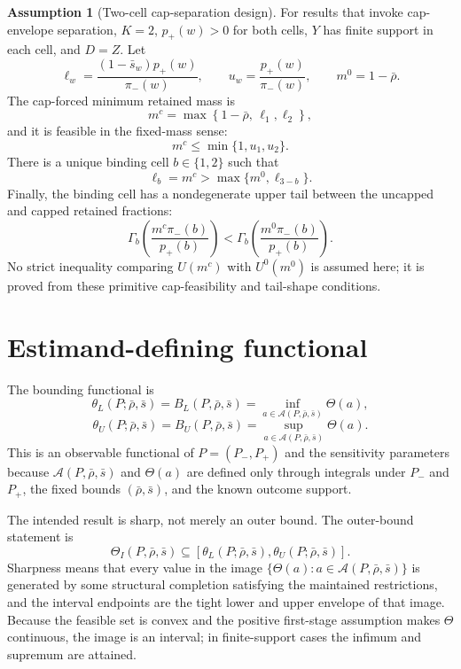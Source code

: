 \documentclass[11pt]{article}
\theoremstyle{definition}
\newtheorem{assumption}{Assumption}
\theoremstyle{plain}
\theoremstyle{remark}
\begin{document}
\begin{assumption}[Two-cell cap-separation design]\label{ass:cap-separation}
For results that invoke cap-envelope separation, \(K=2\), \(p_+(w)>0\) for both cells,
\(Y\) has finite support in each cell, and \(D=Z\).  Let
\[
  \ell_w=\frac{(1-\bar s_w)p_+(w)}{\pi_-(w)},
  \qquad
  u_w=\frac{p_+(w)}{\pi_-(w)},
  \qquad
  m^0=1-\bar\rho .
\]
The cap-forced minimum retained mass is
\[
  m^c=\max\left\{1-\bar\rho,\,
    \ell_1,\ell_2
  \right\},
\]
and it is feasible in the fixed-mass sense:
\[
  m^c\le \min\{1,u_1,u_2\}.
\]
There is a unique binding cell \(b\in\{1,2\}\) such that
\[
  \ell_b=m^c>\max\{m^0,\ell_{3-b}\}.
\]
Finally, the binding cell has a nondegenerate upper tail between the uncapped and capped
retained fractions:
\[
  \Gamma_b\!\left(\frac{m^c\pi_-(b)}{p_+(b)}\right)
  <
  \Gamma_b\!\left(\frac{m^0\pi_-(b)}{p_+(b)}\right).
\]
No strict inequality comparing \(U(m^c)\) with \(U^0(m^0)\) is assumed here; it is proved
from these primitive cap-feasibility and tail-shape conditions.
\end{assumption}

\section{Estimand-defining functional}
The bounding functional is
\[
  \theta_L(P;\bar\rho,\bar s)=B_L(P,\bar\rho,\bar s)
  =\inf_{a\in\mathcal A(P,\bar\rho,\bar s)}\Theta(a),
\]
\[
  \theta_U(P;\bar\rho,\bar s)=B_U(P,\bar\rho,\bar s)
  =\sup_{a\in\mathcal A(P,\bar\rho,\bar s)}\Theta(a).
\]
This is an observable functional of \(P=(P_-,P_+)\) and the sensitivity parameters because
\(\mathcal A(P,\bar\rho,\bar s)\) and \(\Theta(a)\) are defined only through integrals
under \(P_-\) and \(P_+\), the fixed bounds \((\bar\rho,\bar s)\), and the known outcome
support.

The intended result is sharp, not merely an outer bound.  The outer-bound statement is
\[
  \Theta_I(P,\bar\rho,\bar s)\subseteq
  [\theta_L(P;\bar\rho,\bar s),\theta_U(P;\bar\rho,\bar s)].
\]
Sharpness means that every value in the image
\(\{\Theta(a):a\in\mathcal A(P,\bar\rho,\bar s)\}\) is generated by some structural
completion satisfying the maintained restrictions, and the interval endpoints are the
tight lower and upper envelope of that image.  Because the feasible set is convex and the
positive first-stage assumption makes \(\Theta\) continuous, the image is an interval; in
finite-support cases the infimum and supremum are attained.
\end{document}
